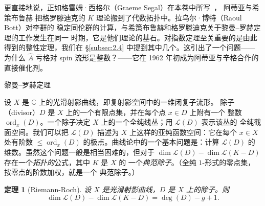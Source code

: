 \documentclass[11pt]{amsart}
\makeatletter
\def\subsection{\@startsection{subsection}{2}%
   \z@{1.25\linespacing\@plus.7\linespacing}{.5\linespacing}%
   {\normalfont\bfseries}}
\theoremstyle{definition}
\theoremstyle{remark}
\theoremstyle{plain}
\newtheorem{theorem}[equation]{定理}
\numberwithin{equation}{section}
\renewcommand{\:}{\colon}
\newcommand{\Ahat}{{\hat A}}
\newcommand{\CC}{{\mathbb C}}
\newcommand{\ZZ}{{\mathbb Z}}
\DeclareMathOperator{\ord}{ord}
\newcommand{\sL}{\mathcal{L}}
\newcommand{\sO}{\mathcal{O}}
\newcommand{\sect}[1]{\sL(#1)}
\makeatother
\begin{document}

更直接地说，正如格雷姆·西格尔（Graeme Segal）在本卷中所写~\cite{Seg4}，
阿蒂亚与希策布鲁赫
把格罗滕迪克的 $K$ 理论搬到了代数拓扑中。拉乌尔·博特（Raoul Bott）对李群的
稳定同伦群的计算，与希策布鲁赫和格罗滕迪克关于黎曼–罗赫定理的工作发生在同一
时期，它是他们理论的基石。对指数定理至关重要的是由此得到的整性定理，我们在
\S\ref{subsec:2.4} 中提到其中几个。这引出了一个问题——为什么 $\Ahat$ 亏格对
spin 流形是整数？——它在 1962 年初成为阿蒂亚与辛格合作的直接催化剂。

\subsection{黎曼–罗赫定理}\label{subsec:2.1}


设 $X$ 是 $\CC$ 上的光滑射影曲线，即复射影空间中的一维闭复子流形。
除子（divisor）$D$ 是 $X$ 上的一个有限点集，并在每个点 $x\in D$ 上附有一个
整数 $\ord_x(D)$。一个除子决定 $X$ 上的一个全纯线丛；用 $\sect D$ 表示该丛的
全纯截面空间。我们可以把 $\sect D$ 描述为 $X$ 上这样的亚纯函数空间：它在每个
$x\in X$ 处有阶数 $\le \ord_x(D)$ 的极点。曲线论中的一个基本问题是：计算
$\sect D$ 的维数。虽然这个问题一般是相当困难的，但对于
$\dim\sect D - \dim\sect{K-D}$ 存在一个{\it 拓扑的}公式，其中 $K$ 是 $X$ 的
一个\emph{典范除子}。（全纯 $1$-形式的零点集，按零点的阶数加权，就是一个
典范除子。）


\begin{theorem}[Riemann-Roch]\label{thm:2}
设 $X$ 是光滑射影曲线，$D$ 是 $X$ 上的除子。则
  \begin{equation}\label{eq:1}
     \dim\sect D - \dim\sect{K-D} = \deg(D) -g + 1.
  \end{equation}
\end{theorem}
\end{document}

